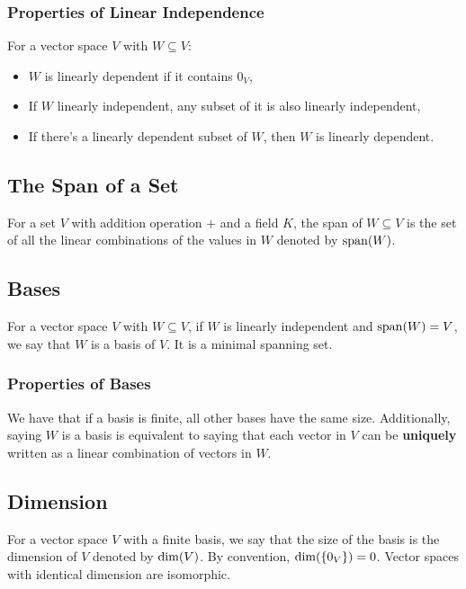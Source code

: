 \subsubsection{Properties of Linear Independence}

For a vector space $V$ with $W \subseteq V$: \begin{itemize}
  \item $W$ is linearly dependent if it contains $0_V$,
  \item If $W$ linearly independent, any subset of it is also
  linearly independent,
  \item If there's a linearly dependent subset of $W$, then $W$
  is linearly dependent.
\end{itemize}

\subsection{The Span of a Set}

For a set $V$ with addition operation $+$ and a field $K$, the span 
of $W \subseteq V$ is the set of all the linear combinations of the values
in $W$ denoted by $\operatorname{span}(W)$.

\subsection{Bases}

For a vector space $V$ with $W \subseteq V$, if $W$ is linearly independent
and $\operatorname{span}(W) = V$, we say that $W$ is a basis of $V$. It is a minimal
spanning set.

\subsubsection{Properties of Bases}

We have that if a basis is finite, all other bases have the same size.
Additionally, saying $W$ is a basis is equivalent to saying that each vector 
in $V$ can be \textbf{uniquely} written as a linear combination of vectors 
in $W$.

\subsection{Dimension}

For a vector space $V$ with a finite basis, we say that the size of the 
basis is the dimension of $V$ denoted by $\operatorname{dim}(V)$.
By convention, $\operatorname{dim}(\{0_V\}) = 0$. Vector spaces with identical
dimension are isomorphic.

